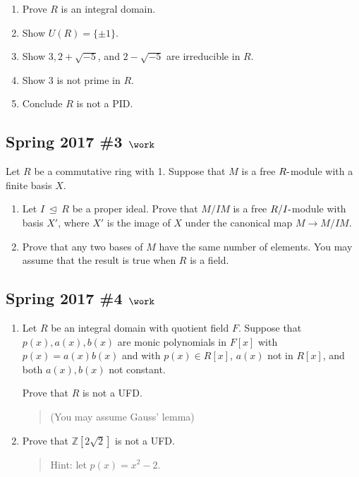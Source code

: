 \begin{enumerate}
\def\labelenumi{\alph{enumi}.}
\item
  Prove \(R\) is an integral domain.
\item
  Show \(U(R) = \{\pm1\}\).
\item
  Show \(3, 2 + \sqrt{-5}\), and \(2 - \sqrt{-5}\) are irreducible in
  \(R\).
\item
  Show 3 is not prime in \(R\).
\item
  Conclude \(R\) is not a PID.
\end{enumerate}

\hypertarget{spring-2017-3-work}{%
\subsection{\texorpdfstring{Spring 2017 \#3
\(\work\)}{Spring 2017 \#3 \textbackslash work}}\label{spring-2017-3-work}}

Let \(R\) be a commutative ring with 1. Suppose that \(M\) is a free
\(R{\hbox{-}}\)module with a finite basis \(X\).

\begin{enumerate}
\def\labelenumi{\alph{enumi}.}
\item
  Let \(I {~\trianglelefteq~}R\) be a proper ideal. Prove that \(M/IM\)
  is a free \(R/I{\hbox{-}}\)module with basis \(X'\), where \(X'\) is
  the image of \(X\) under the canonical map \(M\to M/IM\).
\item
  Prove that any two bases of \(M\) have the same number of elements.
  You may assume that the result is true when \(R\) is a field.
\end{enumerate}

\hypertarget{spring-2017-4-work}{%
\subsection{\texorpdfstring{Spring 2017 \#4
\(\work\)}{Spring 2017 \#4 \textbackslash work}}\label{spring-2017-4-work}}

\begin{enumerate}
\def\labelenumi{\alph{enumi}.}
\item
  Let \(R\) be an integral domain with quotient field \(F\). Suppose
  that \(p(x), a(x), b(x)\) are monic polynomials in \(F[x]\) with
  \(p(x) = a(x) b(x)\) and with \(p(x) \in R[x]\), \(a(x)\) not in
  \(R[x]\), and both \(a(x), b(x)\) not constant.

  Prove that \(R\) is not a UFD.

  \begin{quote}
  (You may assume Gauss' lemma)
  \end{quote}
\item
  Prove that \({\mathbb{Z}}[2\sqrt{2}]\) is not a UFD.

  \begin{quote}
  Hint: let \(p(x) = x^2-2\).
  \end{quote}
\end{enumerate}

